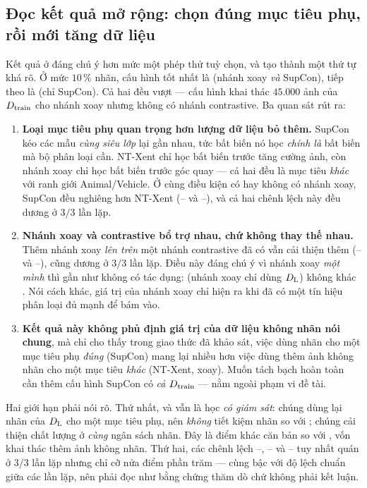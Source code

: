 \subsection{Đọc kết quả mở rộng: chọn đúng mục tiêu phụ, rồi mới tăng dữ liệu}
\label{sec:disc-supcon}

Kết quả ở  đáng chú ý hơn mức một phép thử tuỳ chọn, và tạo thành một
thứ tự khá rõ. Ở mức $10\,\%$ nhãn, cấu hình tốt nhất là  (nhánh xoay \emph{và} SupCon),
tiếp theo là  (chỉ SupCon). Cả hai đều vượt  — cấu hình khai thác $45{.}000$ ảnh
của $D_{\mathrm{train}}$ cho nhánh xoay nhưng không có nhánh contrastive. Ba quan sát rút ra:

\begin{enumerate}[leftmargin=1.2cm,itemsep=3pt]
  \item \textbf{Loại mục tiêu phụ quan trọng hơn lượng dữ liệu bỏ thêm.} SupCon kéo các mẫu
        \emph{cùng siêu lớp} lại gần nhau, tức bất biến nó học \emph{chính là} bất biến mà bộ
        phân loại cần. NT-Xent chỉ học bất biến trước tăng cường ảnh, còn nhánh xoay chỉ học bất
        biến trước góc quay — cả hai đều là mục tiêu \emph{khác} với ranh giới Animal/Vehicle.
        Ở cùng điều kiện có hay không có nhánh xoay, SupCon đều nghiêng hơn NT-Xent
        (-- và --), và cả hai chênh lệch này đều dương ở $3/3$
        lần lặp.
  \item \textbf{Nhánh xoay và contrastive bổ trợ nhau, chứ không thay thế nhau.} Thêm nhánh
        xoay \emph{lên trên} một nhánh contrastive đã có vẫn cải thiện thêm
        (-- và --), cũng dương ở $3/3$ lần lặp. Điều này đáng
        chú ý vì nhánh xoay \emph{một mình} thì gần như không có tác dụng:  (nhánh xoay
        chỉ dùng $D_{\mathrm{L}}$) không khác . Nói cách khác, giá trị của nhánh xoay chỉ hiện ra
        khi đã có một tín hiệu phân loại đủ mạnh để bám vào.
  \item \textbf{Kết quả này không phủ định giá trị của dữ liệu không nhãn nói chung}, mà chỉ
        cho thấy trong giao thức đã khảo sát, việc dùng nhãn cho một mục tiêu phụ \emph{đúng}
        (SupCon) mang lại nhiều hơn việc dùng thêm ảnh không nhãn cho một mục tiêu \emph{khác}
        (NT-Xent, xoay). Muốn tách bạch hoàn toàn cần thêm cấu hình SupCon có \emph{cả}
        $D_{\mathrm{train}}$ — nằm ngoài phạm vi đề tài.
\end{enumerate}

Hai giới hạn phải nói rõ. Thứ nhất,  và  vẫn là học \emph{có giám sát}: chúng
dùng lại nhãn của $D_{\mathrm{L}}$ cho một mục tiêu phụ, nên \emph{không} tiết kiệm nhãn so với ;
chúng cải thiện chất lượng ở \emph{cùng} ngân sách nhãn. Đây là điểm khác căn bản so với
, vốn khai thác thêm ảnh không nhãn. Thứ hai, các chênh lệch --,
-- và -- tuy nhất quán ở $3/3$ lần lặp nhưng chỉ cỡ nửa điểm phần
trăm — cùng bậc với độ lệch chuẩn giữa các lần lặp, nên phải đọc như bằng chứng thăm dò chứ
không phải kết luận.

